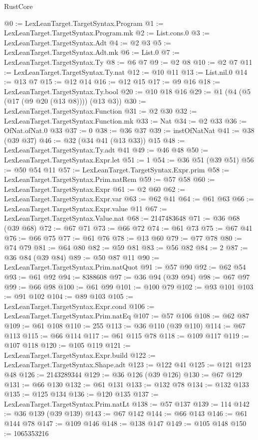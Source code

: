 \begin{lexlean}{RustCore}
\begin{coremodule}
@0 := LexLeanTarget.TargetSyntax.Program
@1 := LexLeanTarget.TargetSyntax.Program.mk
@2 := List.cons.{0}
@3 := LexLeanTarget.TargetSyntax.Adt
@4 := @2 @3
@5 := LexLeanTarget.TargetSyntax.Adt.mk
@6 := List.{0}
@7 := LexLeanTarget.TargetSyntax.Ty
@8 := @6 @7
@9 := @2 @8
@10 := @2 @7
@11 := LexLeanTarget.TargetSyntax.Ty.nat
@12 := @10 @11
@13 := List.nil.{0}
@14 := @13 @7
@15 := @12 @14
@16 := @12 @15
@17 := @9 @16
@18 := LexLeanTarget.TargetSyntax.Ty.bool
@20 := @10 @18 @16
@29 := @1 (@4 (@5 (@17 (@9 @20 (@13 @8)))) (@13 @3))
@30 := LexLeanTarget.TargetSyntax.Function
@31 := @2 @30
@32 := LexLeanTarget.TargetSyntax.Function.mk
@33 := Nat
@34 := @2 @33
@36 := OfNat.ofNat.{0} @33
@37 := 0
@38 := @36 @37
@39 := instOfNatNat
@41 := @38 (@39 @37)
@46 := @32 (@34 @41 (@13 @33)) @15
@48 := LexLeanTarget.TargetSyntax.Ty.adt @41
@49 := @46 @48
@50 := LexLeanTarget.TargetSyntax.Expr.let
@51 := 1
@54 := @36 @51 (@39 @51)
@56 := @50 @54 @11
@57 := LexLeanTarget.TargetSyntax.Expr.prim
@58 := LexLeanTarget.TargetSyntax.Prim.natRem
@59 := @57 @58
@60 := LexLeanTarget.TargetSyntax.Expr
@61 := @2 @60
@62 := LexLeanTarget.TargetSyntax.Expr.var
@63 := @62 @41
@64 := @61 @63
@66 := LexLeanTarget.TargetSyntax.Expr.value @11
@67 := LexLeanTarget.TargetSyntax.Value.nat
@68 := 2147483648
@71 := @36 @68 (@39 @68)
@72 := @67 @71
@73 := @66 @72
@74 := @61 @73
@75 := @67 @41
@76 := @66 @75
@77 := @61 @76
@78 := @13 @60
@79 := @77 @78
@80 := @74 @79
@81 := @64 @80
@82 := @59 @81
@83 := @56 @82
@84 := 2
@87 := @36 @84 (@39 @84)
@89 := @50 @87 @11
@90 := LexLeanTarget.TargetSyntax.Prim.natQuot
@91 := @57 @90
@92 := @62 @54
@93 := @61 @92
@94 := 8388608
@97 := @36 @94 (@39 @94)
@98 := @67 @97
@99 := @66 @98
@100 := @61 @99
@101 := @100 @79
@102 := @93 @101
@103 := @91 @102
@104 := @89 @103
@105 := LexLeanTarget.TargetSyntax.Expr.cond
@106 := LexLeanTarget.TargetSyntax.Prim.natEq
@107 := @57 @106
@108 := @62 @87
@109 := @61 @108
@110 := 255
@113 := @36 @110 (@39 @110)
@114 := @67 @113
@115 := @66 @114
@117 := @61 @115 @78
@118 := @109 @117
@119 := @107 @118
@120 := @105 @119
@121 := LexLeanTarget.TargetSyntax.Expr.build
@122 := LexLeanTarget.TargetSyntax.Shape.adt
@123 := @122 @41
@125 := @121 @123 @48
@126 := 2143289344
@129 := @36 @126 (@39 @126)
@130 := @67 @129
@131 := @66 @130
@132 := @61 @131
@133 := @132 @78
@134 := @132 @133
@135 := @125 @134
@136 := @120 @135
@137 := LexLeanTarget.TargetSyntax.Prim.natLt
@138 := @57 @137
@139 := 114
@142 := @36 @139 (@39 @139)
@143 := @67 @142
@144 := @66 @143
@146 := @61 @144 @78
@147 := @109 @146
@148 := @138 @147
@149 := @105 @148
@150 := 1065353216

\end{coremodule}
\end{lexlean}
